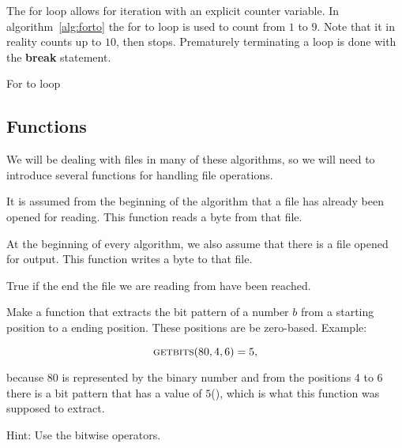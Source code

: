 The for loop allows for iteration with an explicit counter
variable. In algorithm~\ref{alg:forto} the for to loop is used to
count from $1$ to $9$. Note that it in reality counts up to $10$, then
stops. Prematurely terminating a loop is done with the \textbf{break}
statement.

\begin{algorithm}
  \caption{For to loop}\algohack{}
  \label{alg:forto}
  \begin{algorithmic}[1]
    \EndFor
  \end{algorithmic}
\end{algorithm}

\subsection{Functions}
\label{sec:pseudocode}

We will be dealing with files in many of these algorithms, so we will need
to introduce several functions for handling file operations.

\begin{description}[font=\normalfont]
\item[\VoidCall{ReadByte}] It is assumed from the beginning of the
  algorithm that a file has already been opened for reading. This
  function reads a byte from that file.

\item[\Call{WriteByte}{$\var{byte}$}] At the beginning of every algorithm,
  we also assume that there is a file opened for output. This function
  writes a byte to that file.

\item[\VoidCall{EndOfFileReached}] True if the end the file we are
  reading from have been reached.

\end{description}

\begin{Exercise}[label={getbits}]

  Make a function  that
  extracts the bit pattern of a number $b$ from a starting position to
  a ending position. These positions are be zero-based. Example:

  \begin{equation*}
    \Call{getbits}{80, 4, 6}=5,
  \end{equation*}

  because $80$ is represented
  by the binary number  and from the positions 4 to 6
  there is a bit pattern that has a value of $5$(), which is
  what this function was supposed to extract.

  Hint: Use the bitwise operators.

\end{Exercise}

